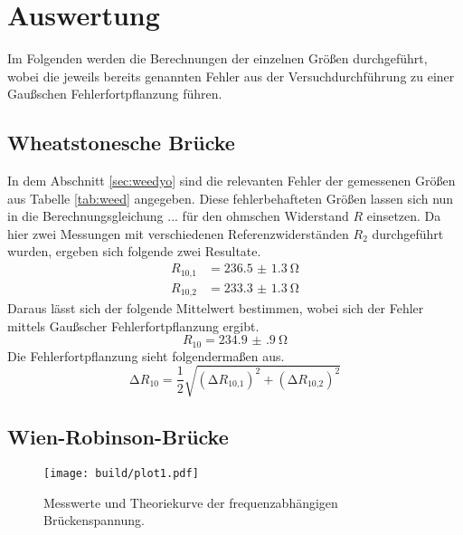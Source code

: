 \section{Auswertung}
Im Folgenden werden die Berechnungen der einzelnen Größen durchgeführt, wobei die jeweils bereits genannten Fehler aus der Versuchdurchführung zu einer
Gaußschen Fehlerfortpflanzung führen. 

\subsection{Wheatstonesche Brücke}
In dem Abschnitt \ref{sec:weedyo} sind die relevanten Fehler der gemessenen Größen aus Tabelle \ref{tab:weed} angegeben. Diese fehlerbehafteten Größen lassen sich nun in die Berechnungsgleichung ...
für den ohmschen Widerstand $R$ einsetzen.
Da hier zwei Messungen mit verschiedenen Referenzwiderständen $R_{2}$ durchgeführt wurden, ergeben sich folgende zwei Resultate.
\begin{align}
R_{10\text{,}1} &= \SI{236.5(13)}{\ohm} \\
R_{10\text{,}2} &= \SI{233.3(13)}{\ohm} 
\end{align}
Daraus lässt sich der folgende Mittelwert bestimmen, wobei sich der Fehler mittels Gaußscher Fehlerfortpflanzung ergibt.
\begin{equation}
R_{10} = \SI{234.9(9)}{\ohm}
\end{equation}
Die Fehlerfortpflanzung sieht folgendermaßen aus.
\begin{equation}
\increment R_{10} = \frac{1}{2} \sqrt{(\increment R_{10\text{,}1})^{2} + (\increment R_{10\text{,}2})^{2} }
\end{equation}


\subsection{Wien-Robinson-Brücke}

\begin{figure}
    \centering
    \texttt{[image: build/plot1.pdf]}
    \caption{Messwerte und Theoriekurve der frequenzabhängigen Brückenspannung.} 
    \label{fig:plot1}
\end{figure}
